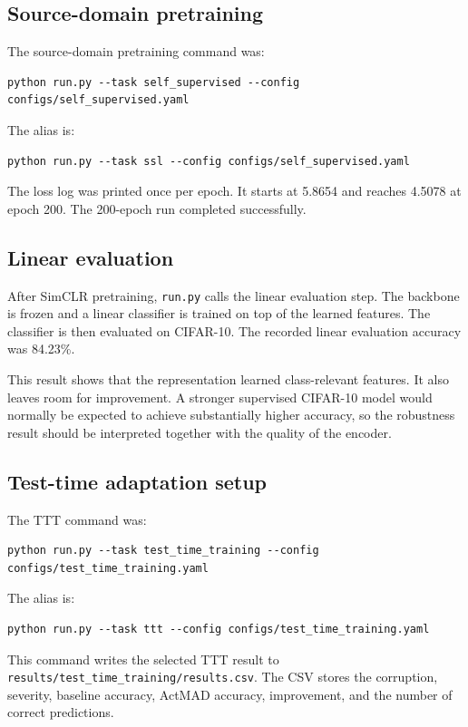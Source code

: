 \documentclass[a4paper,11pt]{article}
\begin{document}
\subsection{Source-domain pretraining}

The source-domain pretraining command was:
\begin{lstlisting}
python run.py --task self_supervised --config configs/self_supervised.yaml
\end{lstlisting}
The alias is:
\begin{lstlisting}
python run.py --task ssl --config configs/self_supervised.yaml
\end{lstlisting}
The loss log was printed once per epoch. It starts at 5.8654 and reaches 4.5078 at epoch 200. The 200-epoch run completed successfully.

\subsection{Linear evaluation}

After SimCLR pretraining, \texttt{run.py} calls the linear evaluation step. The backbone is frozen and a linear classifier is trained on top of the learned features. The classifier is then evaluated on CIFAR-10. The recorded linear evaluation accuracy was 84.23\%.

This result shows that the representation learned class-relevant features. It also leaves room for improvement. A stronger supervised CIFAR-10 model would normally be expected to achieve substantially higher accuracy, so the robustness result should be interpreted together with the quality of the encoder.

\subsection{Test-time adaptation setup}

The TTT command was:
\begin{lstlisting}
python run.py --task test_time_training --config configs/test_time_training.yaml
\end{lstlisting}
The alias is:
\begin{lstlisting}
python run.py --task ttt --config configs/test_time_training.yaml
\end{lstlisting}

This command writes the selected TTT result to \texttt{results/test\_time\_training/results.csv}. The CSV stores the corruption, severity, baseline accuracy, ActMAD accuracy, improvement, and the number of correct predictions.
\end{document}
